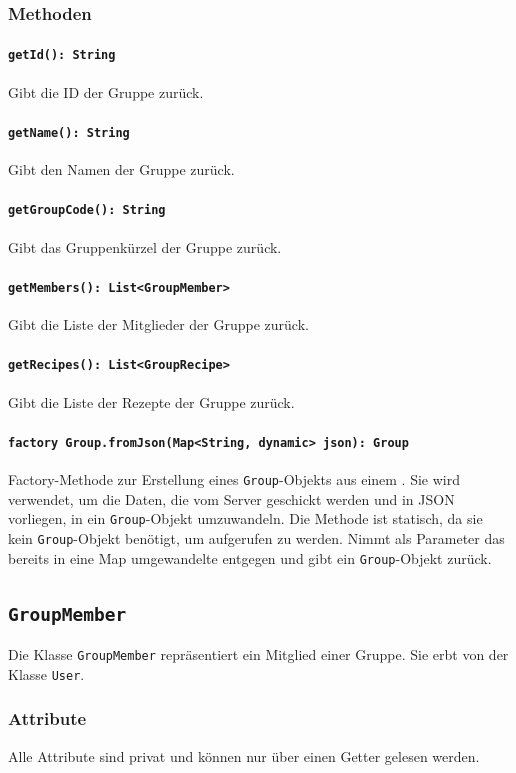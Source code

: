 \documentclass{entwurfsheft}
\begin{document}
\begin{sloppypar}
\subsubsection*{Methoden}
\paragraph{\texttt{getId(): String}}
Gibt die ID der Gruppe zurück.
\paragraph{\texttt{getName(): String}}
Gibt den Namen der Gruppe zurück.
\paragraph{\texttt{getGroupCode(): String}}
Gibt das Gruppenkürzel der Gruppe zurück.
\paragraph{\texttt{getMembers(): List<GroupMember>}}
Gibt die Liste der Mitglieder der Gruppe zurück.
\paragraph{\texttt{getRecipes(): List<GroupRecipe>}}
Gibt die Liste der Rezepte der Gruppe zurück.
\paragraph{\texttt{factory Group.fromJson(Map<String, dynamic> json): Group}} Factory-Methode zur Erstellung eines \texttt{Group}-Objekts aus einem . Sie wird verwendet, um die Daten, die vom Server geschickt werden und in \Gls{JSON} vorliegen, in ein \texttt{Group}-Objekt umzuwandeln. Die Methode ist statisch, da sie kein \texttt{Group}-Objekt benötigt, um aufgerufen zu werden. Nimmt als Parameter das bereits in eine Map umgewandelte  entgegen und gibt ein \texttt{Group}-Objekt zurück.

\newpage
\subsection{\texttt{GroupMember}}\label{sec:groupMember}
Die Klasse \texttt{GroupMember} repräsentiert ein Mitglied einer Gruppe. Sie erbt von der Klasse \texttt{User}.
\subsubsection*{Attribute}
Alle Attribute sind privat und können nur über einen Getter gelesen werden.

\end{sloppypar}
\end{document}
